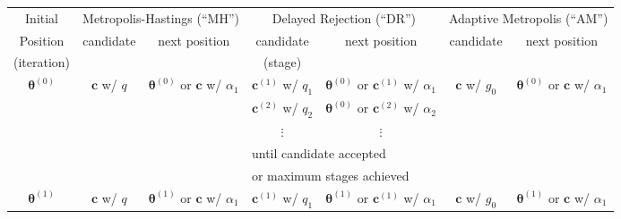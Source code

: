 \begin{sidewaystable}[h]
\begin{tabular}{|c||c|c||c|c||c|c|}
\hline
 Initial             & \multicolumn{2}{c||}{Metropolis-Hastings (``MH'')}                & \multicolumn{2}{c||}{Delayed Rejection (``DR'')}                         & \multicolumn{2}{c|}{Adaptive Metropolis (``AM'')}          \\
\cline{2-7}
 Position            & candidate               & next position                           & candidate              & next position                                   & candidate        & next position                           \\
(iteration)          &                         &                                         & (stage)                &                                                 &                  &                                         \\
\hline
\hline
$\boldsymbol{\theta}^{(0)}$       & $\mathbf{c}$ w/ $q$              & $\boldsymbol{\theta}^{(0)}$ or $\mathbf{c}$ w/ $\alpha_1$       & $\mathbf{c}^{(1)}$ w/ $q_1$     & $\boldsymbol{\theta}^{(0)}$ or $\mathbf{c}^{(1)}$ w/ $\alpha_1$       & $\mathbf{c}$ w/ $g_0$     & $\boldsymbol{\theta}^{(0)}$ or $\mathbf{c}$ w/ $\alpha_1$       \\
\cline{4-5}
                     &                         &                                         & $\mathbf{c}^{(2)}$ w/ $q_2$     & $\boldsymbol{\theta}^{(0)}$ or $\mathbf{c}^{(2)}$ w/ $\alpha_2$       &                  &                                         \\
\cline{4-5}
                     &                         &                                         & $\vdots$               & $\vdots$                                        &                  &                                         \\
\cline{4-5}
                     &                         &                                         & \multicolumn{2}{l||}{until candidate accepted}                           &                  &                                         \\
                     &                         &                                         & \multicolumn{2}{l||}{or maximum stages achieved}                         &                  &                                         \\
\hline 
\hline
$\boldsymbol{\theta}^{(1)}$       & $\mathbf{c}$ w/ $q$              & $\boldsymbol{\theta}^{(1)}$ or $\mathbf{c}$ w/ $\alpha_1$       & $\mathbf{c}^{(1)}$ w/ $q_1$     & $\boldsymbol{\theta}^{(1)}$ or $\mathbf{c}^{(1)}$ w/ $\alpha_1$       & $\mathbf{c}$ w/ $g_0$     & $\boldsymbol{\theta}^{(1)}$ or $\mathbf{c}$ w/ $\alpha_1$       \\

\end{tabular}
\end{sidewaystable}

